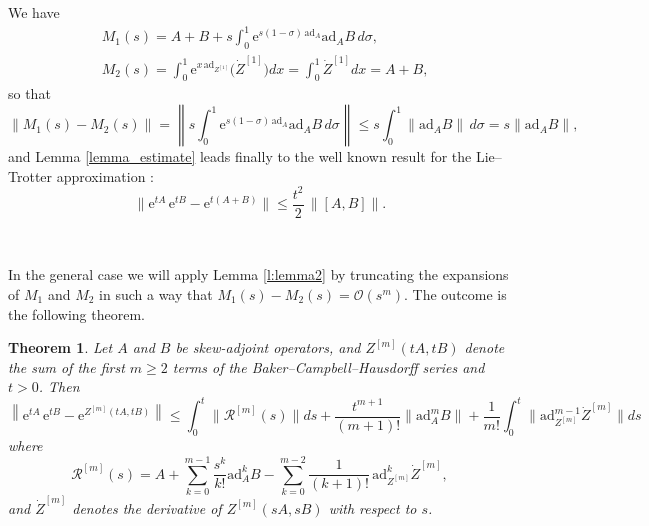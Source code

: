 \documentclass[11pt]{article}
\newcommand{\e}{\ensuremath{\mathrm{e}}}
\newcommand{\ad}{\ensuremath{\mathrm{ad}}}
\newtheorem{theorem}{Theorem}[section]
\begin{document}
 We have
 \[
 \begin{aligned}
  & M_1(s) = A + B + s \int_0^1 \e^{ s(1-\sigma)\, \ad_{A}} \ad_A B \, d\sigma, \\
  & M_2(s) = \int_0^1 \e^{x \, \ad_{Z^{[1]}}} \big(\dot{Z}^{[1]}\big) dx = \int_0^1 \dot{Z}^{[1]} dx = A + B,
 \end{aligned}
 \]
 so that
 \[ 
  \|M_1(s) - M_2(s)\| =  \left\|  s \int_0^1 \e^{ s(1-\sigma)\, \ad_{A}} \ad_A B \, d\sigma \right\| \le s \int_0^1 \|  \ad_A B \| \, d \sigma = s \|  \ad_A B \|,
\]
and Lemma \ref{lemma_estimate} leads finally to the well known result for the Lie--Trotter approximation \cite{suzuki85dfo,iserles24aea}:
\begin{equation} \label{lie_trotter}
  \| \e^{t A} \, \e^{t B} - \e^{t(A+B)}\| \le \frac{t^2}{2} \, \|[A,B]\|.
\end{equation}  

\

In the general case we will apply  Lemma \ref{l:lemma2} by truncating the expansions of $M_1$ and $M_2$ in such a way that
$M_1(s) - M_2(s) = \mathcal{O}(s^m)$. The outcome is the following theorem.


\begin{theorem}\label{th:general_bound} 
Let $A$ and $B$ be skew-adjoint operators, and $Z^{[m]}(tA, tB)$ denote the sum of the first $m \ge 2$ 
terms of the Baker--Campbell--Hausdorff series and $t > 0$. Then
\[
   \left\| \e^{t A} \, \e^{t B} - \e^{Z^{[m]}(tA, tB) } \right\| \le \int_0^t \|  \mathcal{R}^{[m]}(s) \| ds + \frac{t^{m+1}}{(m+1)!} \|\ad_A^m B\| + 
   \frac{1}{m!} \int_0^t \|\ad_{Z^{[m]}}^{m-1} \dot{Z}^{[m]} \| ds
\]
where 
\begin{equation} \label{def_R}
    \mathcal{R}^{[m]}(s) = A + \sum_{k=0}^{m-1} \frac{s^k}{k!} \ad_A^k B - \sum_{k=0}^{m-2} \frac{1}{(k+1)!} \, \ad_{Z^{[m]}}^k \dot{Z}^{[m]} ,
\end{equation}
and $ \dot{Z}^{[m]}$ denotes the derivative of $Z^{[m]}(sA,sB)$ with respect to $s$.
\end{theorem}   
   
\end{document}
